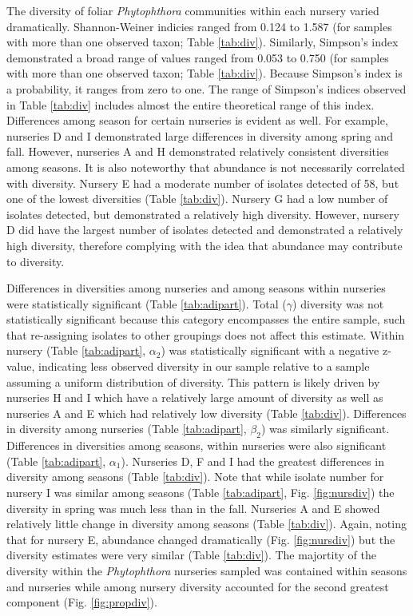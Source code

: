 \documentclass[12pt]{article}
\begin{document}
The diversity of foliar \emph{Phytophthora} communities within each nursery varied dramatically.  Shannon-Weiner indicies ranged from 0.124 to 1.587 (for samples with more than one observed taxon; Table \ref{tab:div}).  Similarly, Simpson's index demonstrated a broad range of values ranged from 0.053 to 0.750 (for samples with more than one observed taxon; Table \ref{tab:div}).  Because Simpson's index is a probability, it ranges from zero to one.  The range of Simpson's indices observed in Table \ref{tab:div} includes almost the entire theoretical range of this index.  Differences among season for certain nurseries is evident as well.  For example, nurseries D and I demonstrated large differences in diversity among spring and fall.  However, nurseries A and H demonstrated relatively consistent diversities among seasons.  It is also noteworthy that abundance is not necessarily correlated with diversity.  Nursery E had a moderate number of isolates detected of 58, but one of the lowest diversities (Table \ref{tab:div}).  Nursery G had a low number of isolates detected, but demonstrated a relatively high diversity.  However, nursery D did have the largest number of isolates detected and demonstrated a relatively high diversity, therefore complying with the idea that abundance may contribute to diversity.

Differences in diversities among nurseries and among seasons within nurseries were statistically significant (Table \ref{tab:adipart}).  Total ($\gamma$)  diversity was not statistically significant because this category encompasses the entire sample, such that re-assigning isolates to other groupings does not affect this estimate.  Within nursery (Table \ref{tab:adipart}, $\alpha_{2}$) was statistically significant with a negative z-value, indicating less observed diversity in our sample relative to a sample assuming a uniform distribution of diversity.  This pattern is likely driven by nurseries H and I which have a relatively large amount of diversity as well as nurseries A and E which had relatively low diversity (Table \ref{tab:div}).  Differences in diversity among nurseries (Table \ref{tab:adipart}, $\beta_{2}$) was similarly significant.  Differences in diversities among seasons, within nurseries were also significant (Table \ref{tab:adipart}, $\alpha_{1}$).  Nurseries D, F and I had the greatest differences in diversity among seasons (Table \ref{tab:div}).  Note that while isolate number for nursery I was similar among seasons (Table \ref{tab:adipart}, Fig. \ref{fig:nursdiv}) the diversity in spring was much less than in the fall.  Nurseries A and E showed relatively little change in diversity among seasons (Table \ref{tab:div}).  Again, noting that for nursery E, abundance changed dramatically (Fig. \ref{fig:nursdiv}) but the diversity estimates were very similar (Table \ref{tab:div}).  The majortity of the diversity within the \emph{Phytophthora} nurseries sampled was contained within seasons and nurseries while among nursery diversity accounted for the second greatest component (Fig. \ref{fig:propdiv}).
\end{document}
